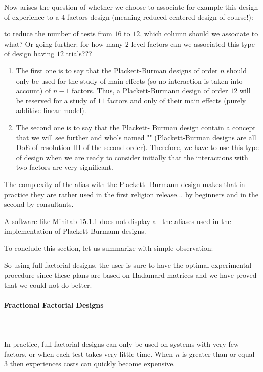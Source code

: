 	Now arises the question of whether we choose to associate for example this design of experience to a $4$ factors design (meaning reduced centered design of course!):
	
	to reduce the number of tests from $16$ to $12$, which column should we associate to what? Or going further: for how many $2$-level factors can we associated this type of design having $12$ trials???
	\begin{enumerate}
		\item The first one is to say that the Plackett-Burman designs of order $n$ should only be used for the study of main effects (so no interaction is taken into account) of $n-1$ factors. Thus, a Plackett-Burmann design of order $12$ will be reserved for a study of $11$ factors and only of their main effects (purely additive linear model).

		\item The second one is to say that the Plackett- Burman design contain a concept that we will see further and who's named "" (Plackett-Burman designs are all DoE of resolution III of the second order). Therefore, we have to use this type of design when we are ready to consider initially that the interactions with two factors are very significant.
	\end{enumerate}
	The complexity of the alias with the Plackett- Burmann design makes that in practice they are rather used in the first religion release... by beginners and in the second by consultants.
	\begin{tcolorbox}[title=Remark,colframe=black,arc=10pt]
	A software like Minitab 15.1.1 does not display all the aliases used in the implementation of Plackett-Burmann designs.
	\end{tcolorbox}
	To conclude this section, let us summarize with simple observation:
	
	So using full factorial designs, the user is sure to have the optimal experimental procedure since these plans are based on Hadamard matrices and we have proved that we could not do better.
	
	\pagebreak
	\paragraph{Fractional Factorial Designs}\mbox{}\\\\
	In practice, full factorial designs can only be used on systems with very few factors, or when each test takes very little time. When $n$ is greater than or equal $3$ then experiences costs can quickly become expensive.


